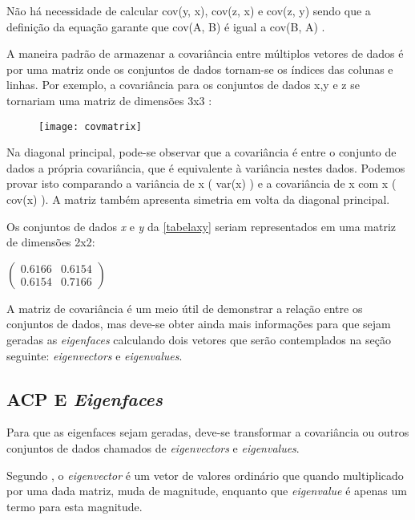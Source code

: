 Não há necessidade de calcular cov(y, x), cov(z, x) e cov(z, y) sendo que a definição da equação garante que cov(A, B) é igual a cov(B, A) .

A maneira padrão de armazenar a covariância entre múltiplos vetores de dados é por uma matriz onde os conjuntos de dados tornam-se os índices das colunas e linhas. Por exemplo, a covariância para os conjuntos de dados x,y e z se tornariam uma matriz de dimensões 3x3 \cite{drmathew_java_programming}:

\begin{figure}[h]
	\centering
	\texttt{[image: covmatrix]}
	\label{fig:covmatrix}
\end{figure}

Na diagonal principal, pode-se observar que a covariância é entre o conjunto de dados a própria covariância, que é equivalente à variância nestes dados. Podemos provar isto comparando a variância de x ( var(x) ) e a covariância de x com x ( cov(x) ). A matriz também apresenta simetria em volta da diagonal principal. 

Os conjuntos de dados \textit{x} e \textit{y} da \autoref{tabelaxy} seriam representados em uma matriz de dimensões 2x2:

\begin{center}
	$\begin{pmatrix} 0.6166 & 0.6154 \\ 0.6154 & 0.7166 \end{pmatrix}$
\end{center}


A matriz de covariância é um meio útil de demonstrar a relação entre os conjuntos de dados, mas deve-se obter ainda mais informações para que sejam geradas as \textit{eigenfaces} calculando dois vetores que serão contemplados na seção seguinte: \textit{eigenvectors} e \textit{eigenvalues}.

\subsection{ACP E \textit{Eigenfaces}}\label{subsec:acp-eigen}

Para que as eigenfaces sejam geradas, deve-se transformar a covariância ou outros conjuntos de dados chamados de \textit{eigenvectors} e \textit{eigenvalues}.

Segundo \cite{drmathew_java_programming}, o \textit{eigenvector} é um vetor de valores ordinário que quando multiplicado por uma dada matriz, muda de magnitude, enquanto que \textit{eigenvalue} é apenas um termo para esta magnitude. 

